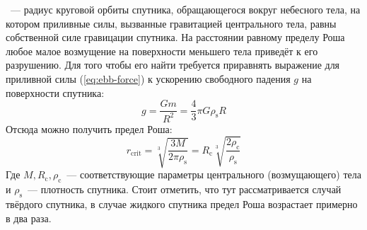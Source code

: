 ~--- радиус круговой орбиты спутника, обращающегося вокруг небесного тела, на котором приливные силы, вызванные гравитацией центрального тела, равны собственной силе гравицации спутника. На расстоянии равному пределу Роша любое малое возмущение на поверхности меньшего тела приведёт к его разрушению. Для того чтобы его найти требуется приравнять выражение для приливной силы (\ref{eq:ebb-force}) к ускорению свободного падения $g$ на поверхности спутника:
\begin{equation*}
    g=\frac{G m}{R^2}=\frac{4}{3} \pi G \rho_{\text{s}} R
\end{equation*}
Отсюда можно получить предел Роша:
\begin{equation*}
    r_{\text{crit}} = \sqrt[3]{\frac{3M}{2\pi\rho_{\text{s}}}}=R_{\text{c}} \sqrt[3]{\frac{2\rho_{\text{c}}}{\rho_{\text{s}}}}
\end{equation*}
Где $M, R_{\text{c}}, \rho_{\text{c}}$~--- соответствующие параметры центрального (возмущающего) тела и $\rho_{\text{s}}$~--- плотность спутника. Стоит отметить, что тут рассматривается случай твёрдого спутника, в случае жидкого спутника предел Роша возрастает примерно в два раза.
